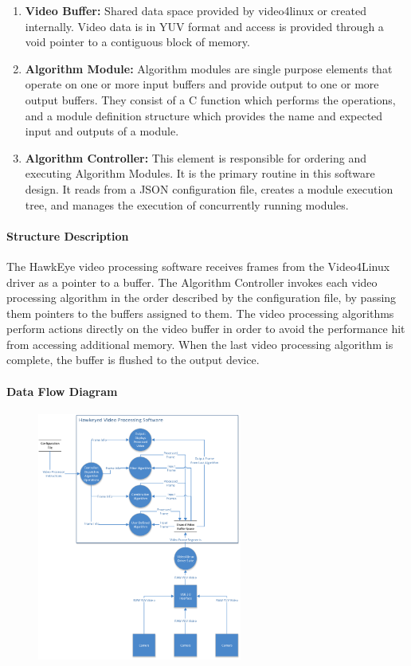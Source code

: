 	\begin{enumerate}[leftmargin=2cm,labelindent=2cm]
	\item \textbf{Video Buffer:}
	Shared data space provided by video4linux or created internally. Video data is in YUV format and access is provided through a void pointer to a 	contiguous block of memory.
	\item \textbf{Algorithm Module:} 
	Algorithm modules are single purpose elements that operate on one or more input buffers and provide output to one or more output buffers. They 	consist of a C function which performs the operations, and a module definition structure which provides the name and expected input and outputs 	of a module. 
	\item \textbf{Algorithm Controller:}
	This element is responsible for ordering and executing Algorithm Modules. It is the primary routine in this software design. It reads from a JSON 	configuration file, creates a module execution tree, and manages the execution of concurrently running modules.\\
	\end{enumerate}
	
	\paragraph{Structure Description}
	The HawkEye video processing software receives frames from the Video4Linux driver as a pointer to a buffer. The Algorithm Controller invokes each video processing algorithm in the order described by the configuration file, by passing them pointers to the buffers assigned to them. The video processing algorithms perform actions directly on the video buffer in order to avoid the performance hit from accessing additional memory. When the last video processing algorithm is complete, the buffer is flushed to the output device.\\
	
	\paragraph{Data Flow Diagram}
	\begin{figure}[H] 
		\centering
		\includegraphics[width=0.6\textwidth,natwidth=610,natheight=642]{images/DataFlow_Diagram.png}  
		\end{figure}
	

